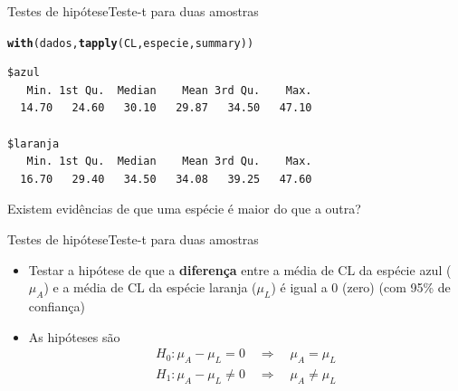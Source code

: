 \documentclass[10pt]{beamer}\usepackage[]{graphicx}\usepackage[]{color}
\makeatletter
\newcommand{\hlstd}[1]{\textcolor[rgb]{0.345,0.345,0.345}{#1}}%
\newcommand{\hlkwd}[1]{\textcolor[rgb]{0.737,0.353,0.396}{\textbf{#1}}}%
\newenvironment{kframe}{%
 \def\at@end@of@kframe{}%
 \ifinner\ifhmode%
  \def\at@end@of@kframe{\end{minipage}}%
  \begin{minipage}{\columnwidth}%
 \fi\fi%
 \def\FrameCommand##1{\hskip\@totalleftmargin \hskip-\fboxsep
 \colorbox{shadecolor}{##1}\hskip-\fboxsep
     \hskip-\linewidth \hskip-\@totalleftmargin \hskip\columnwidth}%
 \MakeFramed {\advance\hsize-\width
   \@totalleftmargin\z@ \linewidth\hsize
   \@setminipage}}%
 {\par\unskip\endMakeFramed%
 \at@end@of@kframe}
\newenvironment{knitrout}{}{} %
\theoremstyle{definition}
\makeatother
\begin{document}
\begin{frame}[fragile=singleslide]{Testes de hipótese}{Teste-t para duas amostras}
\begin{knitrout}\small
{}\color{fgcolor}\begin{kframe}
\begin{alltt}
\hlkwd{with}\hlstd{(dados,} \hlkwd{tapply}\hlstd{(CL, especie, summary))}
\end{alltt}
\begin{verbatim}
$azul
   Min. 1st Qu.  Median    Mean 3rd Qu.    Max. 
  14.70   24.60   30.10   29.87   34.50   47.10 

$laranja
   Min. 1st Qu.  Median    Mean 3rd Qu.    Max. 
  16.70   29.40   34.50   34.08   39.25   47.60 
\end{verbatim}
\end{kframe}
\end{knitrout}
Existem evidências de que uma espécie é maior do que a outra?
\end{frame}

\begin{frame}[fragile=singleslide]{Testes de hipótese}{Teste-t para duas amostras}
  \begin{itemize}
  \item Testar a hipótese de que a \textbf{diferença} entre a média de
    CL da espécie azul ($\mu_A$) e a média de CL da espécie laranja
    ($\mu_L$) é igual a 0 (zero) (com 95\% de confiança)
  \item As hipóteses são
    \begin{align*}
      H_0: \mu_A - \mu_L = 0 \quad \Rightarrow \quad \mu_A = \mu_L \\
      H_1: \mu_A - \mu_L \neq 0 \quad \Rightarrow \quad \mu_A \neq \mu_L
    \end{align*}
  \end{itemize}
\end{frame}
\end{document}

